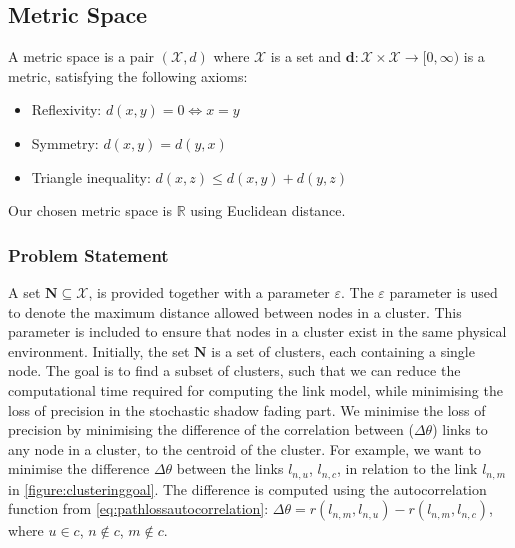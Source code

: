 \subsection{Metric Space}
A metric space is a pair $( \mathcal{X}, d )$ where $ \mathcal{X} $ is a set and $\textbf{d}:\mathcal{X} \times \mathcal{X} \rightarrow [0, \infty )$ is a metric, satisfying the following axioms:

\begin{itemize}
    \item Reflexivity: $d(x, y) = 0 \Longleftrightarrow x = y$
    \item Symmetry: $d(x, y) = d(y, x)$
    \item Triangle inequality: $d(x, z) \leq d(x, y) + d(y, z)$
\end{itemize}

Our chosen metric space is $\mathbb{R}$ using Euclidean distance.


\subsubsection{Problem Statement}

A set $\textbf{N} \subseteq \mathcal{X}$, is provided together with a parameter $\varepsilon$. The $\varepsilon$ parameter is used to denote the maximum distance allowed between nodes in a cluster. This parameter is included to ensure that nodes in a cluster exist in the same physical environment. Initially, the set $\textbf{N}$ is a set of clusters, each containing a single node. The goal is to find a subset of clusters, such that we can reduce the computational time required for computing the link model, while minimising the loss of precision in the stochastic shadow fading part. We minimise the loss of precision by minimising the difference of the correlation between ($\Delta\theta$) links to any node in a cluster, to the centroid of the cluster. For example, we want to minimise the difference $\Delta\theta$ between the links $l_{n,u}$, $l_{n, c}$, in relation to the link $l_{n,m}$ in \autoref{figure:clusteringgoal}. The difference is computed using the autocorrelation function from \autoref{eq:pathlossautocorrelation}: $\Delta\theta = r(l_{n,m}, l_{n,u}) - r(l_{n,m},l_{n,c})$, where $u \in c$, $n \not\in c$, $m \not\in c$.

